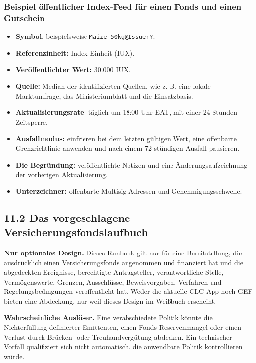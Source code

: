 \documentclass[11pt]{article}
\begin{document}
\subsubsection*{Beispiel öffentlicher Index-Feed für einen Fonds und einen Gutschein}

\begin{itemize}[leftmargin=*]
\item \textbf{Symbol:} beispielsweise \texttt{Maize\_50kg@IssuerY}.
\item \textbf{Referenzinheit:} Index-Einheit (IUX).
\item \textbf{Veröffentlichter Wert:} 30.000 IUX.
\item \textbf{Quelle:} Median der identifizierten Quellen, wie z. B. eine lokale Marktumfrage, das Ministeriumblatt und die Einsatzbasis.
\item \textbf{Aktualisierungsrate:} täglich um 18:00 Uhr EAT, mit einer 24-Stunden-Zeitsperre.
\item \textbf{Ausfallmodus:} einfrieren bei dem letzten gültigen Wert, eine offenbarte Grenzrichtlinie anwenden und nach einem 72-stündigen Ausfall pausieren.
\item \textbf{Die Begründung:} veröffentlichte Notizen und eine Änderungsaufzeichnung der vorherigen Aktualisierung.
\item \textbf{Unterzeichner:} offenbarte Multisig-Adressen und Genehmigungsschwelle.
\end{itemize}
\subsection*{11.2 Das vorgeschlagene Versicherungsfondslaufbuch}

\textbf{Nur optionales Design.} Dieses Runbook gilt nur für eine Bereitstellung, die ausdrücklich einen Versicherungsfonds angenommen und finanziert hat und die abgedeckten Ereignisse, berechtigte Antragsteller, verantwortliche Stelle, Vermögenswerte, Grenzen, Ausschlüsse, Beweisvorgaben, Verfahren und Regelungsbedingungen veröffentlicht hat. Weder die aktuelle CLC App noch GEF bieten eine Abdeckung, nur weil dieses Design im Weißbuch erscheint.

\textbf{Wahrscheinliche Auslöser.} Eine verabschiedete Politik könnte die Nichterfüllung definierter Emittenten, einen Fonds-Reservenmangel oder einen Verlust durch Brücken- oder Treuhandvergütung abdecken. Ein technischer Vorfall qualifiziert sich nicht automatisch. die anwendbare Politik kontrollieren würde.
\end{document}
